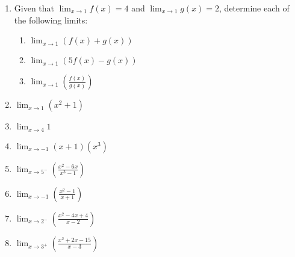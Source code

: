 \documentclass[12pt]{article}
\newif\ifans
\begin{document}
\begin{enumerate}

\item Given that $\displaystyle \lim_{x\rightarrow 1}{f(x)} = 4$ and  $\displaystyle \lim_{x\rightarrow 1}{g(x)}=2 $, determine each of the following limits:

\begin{enumerate}

\item $\displaystyle \lim_{x\rightarrow 1}{\left(f(x)+g(x)\right)}$

\ifans{\fbox{6}} \fi

\item $\displaystyle \lim_{x\rightarrow 1}{\left(5f(x)-g(x)\right)}$

\ifans{\fbox{$18$}} \fi

\item $\displaystyle \lim_{x\rightarrow 1}{\left(\frac{f(x)}{g(x)}\right)}$

\ifans{\fbox{2}} \fi

\end{enumerate}

\item  $\displaystyle \lim_{x\rightarrow 1}{\left(x^2+1\right)}$

\ifans{\fbox{2}} \fi

\item  $\displaystyle \lim_{x\rightarrow 4}{1}$

\ifans{\fbox{1}} \fi

\item $\displaystyle \lim_{x\rightarrow -1}{(x+1)(x^3)}$

\ifans{\fbox{0}} \fi

\item  $\displaystyle \lim_{x\rightarrow 5^-}{\left(\frac{x^2-6x}{x^3-1}\right)}$

\ifans{\fbox{$\displaystyle -\frac{5}{124}$}} \fi

\item $\displaystyle \lim_{x\rightarrow -1}{\left(\frac{x^2-1}{x+1}\right)}$ 

\ifans{\fbox{$-2$}} \fi
 
\item $\displaystyle \lim_{x\rightarrow 2^-}{\left(\frac{x^2-4x+4}{x-2}\right)}$ 

\ifans{\fbox{0}} \fi
 
 \item $\displaystyle \lim_{x\rightarrow 3^+}{\left(\frac{x^2+2x-15}{x-3}\right)}$


\end{enumerate}
\end{document}
